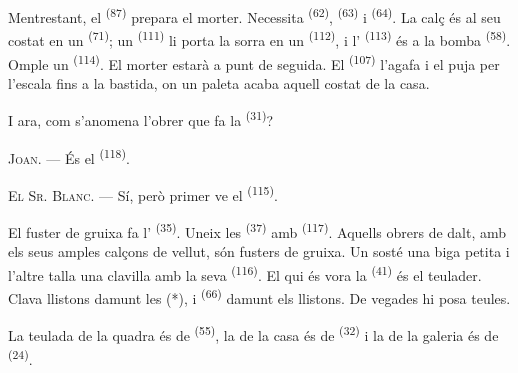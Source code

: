 Mentrestant, el  \textsuperscript{(87)} prepara el morter. Necessita
 \textsuperscript{(62)},  \textsuperscript{(63)} i 
\textsuperscript{(64)}. La calç és al seu costat en un  \textsuperscript{(71)}; un
 \textsuperscript{(111)} li porta la sorra en un 
\textsuperscript{(112)}, i l' \textsuperscript{(113)} és a la bomba
\textsuperscript{(58)}. Omple un  \textsuperscript{(114)}. El morter estarà a
punt de seguida. El  \textsuperscript{(107)} l'agafa i el puja per
l'escala fins a la bastida, on un paleta acaba aquell costat de la casa.

I ara, com s'anomena l'obrer que fa la  \textsuperscript{(31)}?

\textsc{Joan}. --- És el  \textsuperscript{(118)}.

\VUsaut{3.0mm}
\VUsaut{3.0mm}

\textsc{El Sr. Blanc}. --- Sí, però primer ve el 
\textsuperscript{(115)}.

El fuster de gruixa fa l' \textsuperscript{(35)}. Uneix les
 \textsuperscript{(37)} amb 
\textsuperscript{(117)}. Aquells obrers de dalt, amb els seus amples calçons de vellut, són
fusters de gruixa. Un sosté una biga petita i l'altre talla una clavilla amb la seva
 \textsuperscript{(116)}. El qui és vora la
 \textsuperscript{(41)} és el teulader. Clava llistons damunt les
 (*), i  \textsuperscript{(66)} damunt els
llistons. De vegades hi posa teules.


La teulada de la quadra és de  \textsuperscript{(55)}, la de la casa és de
 \textsuperscript{(32)} i la de la galeria és de
 \textsuperscript{(24)}.

